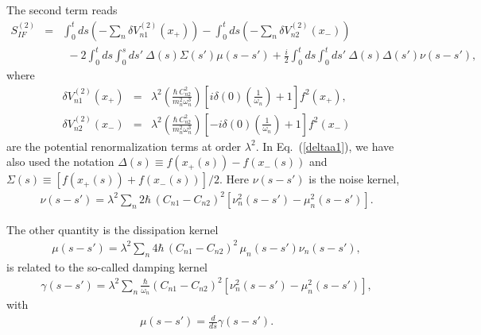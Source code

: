 \documentclass[%
amssymb,preprint,preprintnumbers,nofootinbib,superscriptaddress]{revtex4}
\begin{document}
The second term reads
\begin{eqnarray}\label{deltaa1}
S_{IF}^{(2)}&=&\int_{0}^{t}ds\left(-\sum_{n}\delta V_{n1}^{(2)}(x_{+})\right)-\int_{0}^{t}ds\left(-\sum_{n}\delta V_{n2}^{(2)}(x_{-})\right)\nonumber\\
&&\ \ -2\int_{0}^{t}ds\int_{0}^{s}ds'\ \!\Delta(s)\Sigma(s')\mu(s-s')+\frac{i}{2}\int_{0}^{t}ds\int_{0}^{t}ds'\ \!\Delta(s)\Delta(s')\nu(s-s'),
\end{eqnarray}
where 
\begin{eqnarray}
    \delta V_{n1}^{(2)}(x_{+})&=&\lambda^{2}\left(\frac{\hbar \,C_{n2}^{2}}{m_{n}^{2}\omega_{n}^{3}}\right)\left[i\delta(0)\left(\frac{1}{\omega_{n}}\right)+1\right]f^{2}(x_{+}),\\
    \delta V_{n2}^{(2)}(x_{-})&=&\lambda^{2}\left(\frac{\hbar\,C_{n2}^{2}}{m_{n}^{2}\omega_{n}^{3}}\right)\left[-i\delta(0)\left(\frac{1}{\omega_{n}}\right)+1\right]f^{2}(x_{-})
\end{eqnarray}
are the potential renormalization terms at order $\lambda^{2}$. In Eq.~(\ref{deltaa1}), we have also used the notation $\Delta(s)\equiv f(x_{+}(s))-f(x_{-}(s))$ and $\Sigma(s)\equiv [f(x_{+}(s))+f(x_{-}(s))]/2$. Here  $\nu(s-s')$ is the noise kernel,
\begin{eqnarray}\label{nu}
\nu(s-s')=\lambda^{2}\sum_{n}2\hbar\, (C_{n1}-C_{n2})^{2}\left[\nu_{n}^{2}(s-s')-\mu_{n}^{2}(s-s')\right].
\end{eqnarray}

The other quantity is the dissipation kernel
\begin{eqnarray}
\mu(s-s')=\lambda^{2}\sum_{n}4\hbar\, (C_{n1}-C_{n2})^{2}\,\mu_{n}(s-s')\nu_{n}(s-s'),
\end{eqnarray}
is related to the so-called damping kernel \cite{FJH}
\begin{eqnarray}
\gamma(s-s')=\lambda^{2}\sum_{n}\frac{\hbar}{\omega_{n}}(C_{n1}-C_{n2})^{2}
\left[\nu_{n}^{2}(s-s')-\mu_{n}^{2}(s-s')\right],\label{diszero}
\end{eqnarray}
with
\begin{eqnarray}
\mu(s-s')=\frac{d}{ds}\gamma(s-s').\label{mugamma}
\end{eqnarray}
\end{document}
